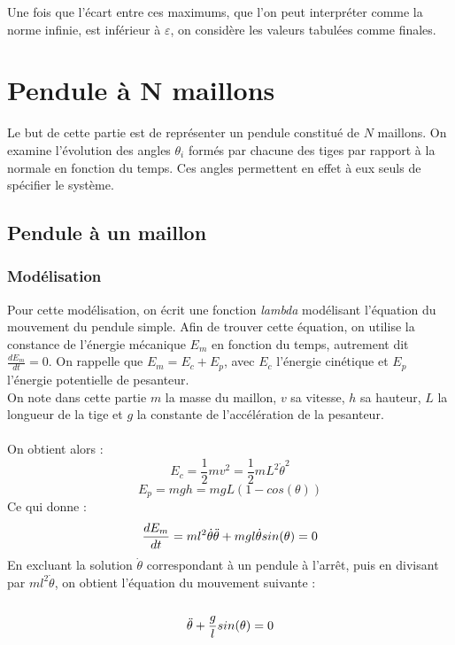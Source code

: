 \documentclass{article}
\begin{document}
Une fois que l'écart entre ces maximums, que l'on peut interpréter comme la norme infinie, est inférieur à $\varepsilon$, on considère les valeurs tabulées comme finales. 

\section{Pendule à N maillons}

Le but de cette partie est de représenter un pendule constitué de $N$ maillons.
On examine l'évolution des angles $\theta_{i}$ formés par chacune des tiges par rapport à la normale en fonction du temps. Ces angles permettent en effet à eux seuls de spécifier le système. 

\subsection{Pendule à un maillon}


\subsubsection{Modélisation}

Pour cette modélisation, on écrit une fonction \textit{lambda} modélisant l'équation du mouvement du pendule simple. 
Afin de trouver cette équation, on utilise la constance de l'énergie mécanique $E_m$ en fonction du temps, autrement dit $\frac{dE_m}{dt} = 0$. On rappelle que  $E_m = E_c + E_p$, avec $E_c$ l'énergie cinétique et $E_p$ l'énergie potentielle de pesanteur. \\
On note dans cette partie $m$ la masse du maillon, $v$ sa vitesse, $h$ sa hauteur, $L$ la longueur de la tige et $g$ la constante de l'accélération de la pesanteur. \\ \\ On obtient alors :
\begin{equation}
    E_c = \frac{1}{2}mv^2 = \frac{1}{2}mL^2\Dot{\theta}^2
\end{equation}
\begin{equation}
    E_p = mgh = mgL(1 - cos(\theta))
\end{equation}
Ce qui donne : 
\begin{equation}
    \frac{dE_m}{dt} = ml^2\Dot{\theta}\Ddot{\theta} + mgl\Dot{\theta}sin(\theta) = 0
\end{equation}
En excluant la solution $\Dot{\theta}$ correspondant à un pendule à l'arrêt, puis en divisant par $ml^2\Dot{\theta}$, on obtient l'équation du mouvement suivante : \\ \\
\begin{equation}
    \Ddot{\theta} + \frac{g}{l}sin(\theta) = 0
    \label{eqpendulesimple}
\end{equation}
\end{document}
